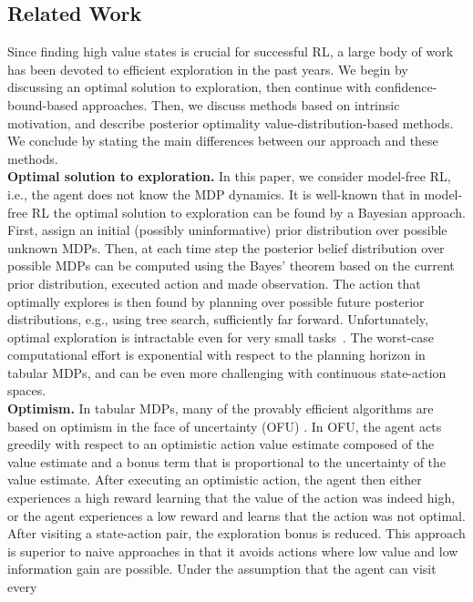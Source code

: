 \documentclass{article}
\begin{document}
\subsection{Related Work}
Since finding high value states is crucial for successful
RL, a large body of work has been devoted to
efficient exploration in the past years. We begin by discussing an optimal solution to exploration, then continue with confidence-bound-based approaches. Then, we discuss methods based on intrinsic motivation, and describe posterior optimality value-distribution-based methods. We conclude by
stating the main differences between our approach and these
methods.
\\[5pt]
\textbf{Optimal solution to exploration.} In this paper, we consider model-free RL, i.e., the agent does not know the MDP dynamics. 
It is well-known that in model-free RL the optimal solution to exploration can be found by a Bayesian approach. First,
assign an initial (possibly uninformative) prior distribution over
possible unknown MDPs. Then, at each time step the posterior belief
distribution over possible MDPs can be computed using the Bayes' theorem
based on the current prior distribution, executed action and made
observation. The action that optimally explores is then found
by planning over possible future posterior distributions, e.g., using tree search, sufficiently far forward. Unfortunately,
optimal exploration is intractable even for very small
tasks~\citep{szepesvari2010algorithms,strens2000bayesian,poupart2006analytic}. The worst-case computational effort is exponential with respect to the planning horizon in tabular MDPs, and can be even more challenging with continuous state-action spaces.
\\[5pt]
\textbf{Optimism.}
In tabular MDPs, many of the provably efficient algorithms are
based on {optimism in the face of uncertainty} (OFU)
\citep{lai1985asymptotically}. In OFU, the agent acts greedily
with respect to an optimistic action value estimate composed of the value
estimate and a bonus term that is proportional to the uncertainty of
the value estimate. After executing an optimistic action, the agent
then either experiences a high reward learning that the value of the action was indeed high, or the agent experiences a low reward and learns that the action was not optimal. After visiting a state-action pair, the exploration bonus is reduced. This approach is superior to naive approaches in that it avoids actions where low value and low information gain are possible. Under the assumption that the agent can visit every
\end{document}
